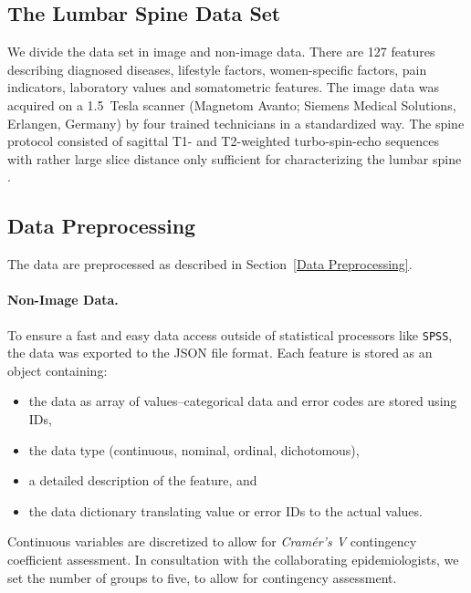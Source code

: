 \documentclass[journal]{style/vgtc} 			          %
\begin{document}
\subsection{The Lumbar Spine Data Set}
We divide the data set in image and non-image data.
%
There are 127 features describing diagnosed diseases, lifestyle factors, women-specific factors, pain indicators, laboratory values and somatometric features. %
%
The image data was acquired on a 1.5~Tesla scanner (Magnetom Avanto; Siemens Medical Solutions, Erlangen, Germany) by four trained technicians in a standardized way.
%
The spine protocol consisted of sagittal T1- and T2-weighted turbo-spin-echo sequences with rather large slice distance only sufficient for characterizing the lumbar spine \cite{Hegenscheid2013}.

\subsection{Data Preprocessing} \label{application:Data Preprocessing}
The data are preprocessed as described in Section~\ref{Data Preprocessing}.
%
\paragraph{Non-Image Data.} 

To ensure a fast and easy data access outside of statistical processors like \texttt{SPSS}, the data was exported to the JSON file format.
%
Each feature is stored as an object containing: 
\begin{itemize}
	\item the data as array of values--categorical data and error codes are stored using IDs,
	\item the data type (continuous, nominal, ordinal, dichotomous),
	\item a detailed description of the feature, and
	\item the data dictionary translating value or error IDs to the actual values.
\end{itemize}
%
Continuous variables are discretized to allow for \emph{Cram\'{e}r's V} contingency coefficient assessment.
%
In consultation with the collaborating epidemiologists, we set the number of groups to five, to allow for contingency assessment.
\end{document}
